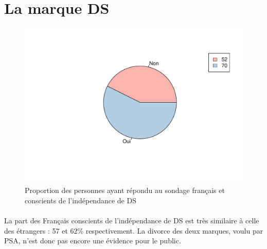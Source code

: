 \documentclass[12pt]{article}\usepackage[]{graphicx}\usepackage[]{color}
\makeatletter
\def\maxwidth{ %
  \ifdim\Gin@nat@width>\linewidth
    \linewidth
  \else
    \Gin@nat@width
  \fi
}
\newenvironment{knitrout}{}{} %
\makeatother
\begin{document}
\break
\section{La marque DS}

\begin{knitrout}
\color{fgcolor}\begin{figure}[H]
\includegraphics[width=\maxwidth]{figure/ds_know_fr-1} \caption[Proportion des personnes ayant répondu au sondage français et conscients de l'indépendance de DS]{Proportion des personnes ayant répondu au sondage français et conscients de l'indépendance de DS}\label{fig:ds know fr}
\end{figure}


\end{knitrout}

%
%

\paragraph{} La part des Français conscients de l'indépendance de DS est
très similaire à celle des étrangers : 57 et 62\% respectivement. La divorce des
deux marques, voulu par PSA, n'est donc pas encore une évidence pour le public.
\end{document}
